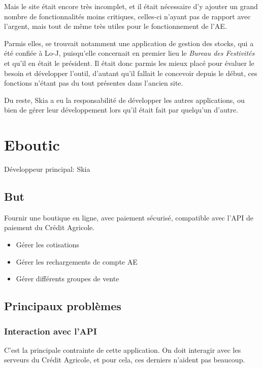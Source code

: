 \documentclass[a4paper]{report}
\begin{document}
\par Mais le site était encore très incomplet, et il était nécessaire d'y ajouter un grand nombre de fonctionnalités
moins critiques, celles-ci n'ayant pas de rapport avec l'argent, mais tout de même très utiles pour le fonctionnement
de l'AE.

\par Parmis elles, se trouvait notamment une application de gestion des stocks, qui a été confiée à Lo-J, puisqu'elle
concernait en premier lieu le \emph{Bureau des Festivités} et qu'il en était le président. Il était donc parmis les
mieux placé pour évaluer le besoin et développer l'outil, d'autant qu'il fallait le concevoir depuis le début, ces
fonctions n'étant pas du tout présentes dans l'ancien site.

\par Du reste, Skia a eu la responsabilité de développer les autres applications, ou bien de gérer leur développement
lors qu'il était fait par quelqu'un d'autre.

\chapter{Eboutic}
\label{sec:eboutic}
\par Développeur principal: Skia

\section{But}
\label{sub:but}
\par Fournir une boutique en ligne, avec paiement sécurisé, compatible avec l'API de paiement du Crédit Agricole.
\begin{itemize}
    \item Gérer les cotisations
    \item Gérer les rechargements de compte AE
    \item Gérer différents groupes de vente
\end{itemize}

\section{Principaux problèmes}
\label{sec:principaux_problemes}

\subsection{Interaction avec l'API}
\label{sub:interaction_avec_l_api}
\par C'est la principale contrainte de cette application. On doit interagir avec les serveurs du Crédit Agricole, et
pour cela, ces derniers n'aident pas beaucoup.
\end{document}
